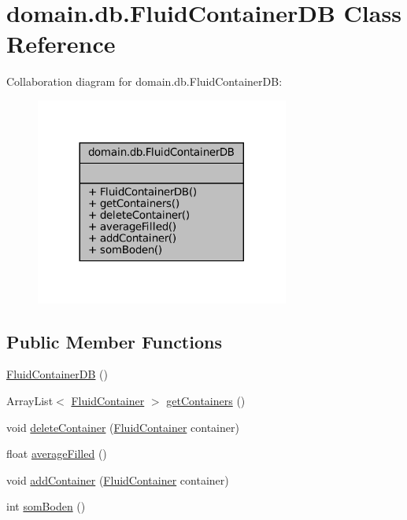 \hypertarget{classdomain_1_1db_1_1FluidContainerDB}{}\section{domain.\+db.\+Fluid\+Container\+DB Class Reference}
\label{classdomain_1_1db_1_1FluidContainerDB}


Collaboration diagram for domain.\+db.\+Fluid\+Container\+DB\+:
\nopagebreak
\begin{figure}[H]
\begin{center}
\leavevmode
\includegraphics[width=236pt]{classdomain_1_1db_1_1FluidContainerDB__coll__graph}
\end{center}
\end{figure}
\subsection*{Public Member Functions}
\begin{DoxyCompactItemize}
\item 
\mbox{\hyperlink{classdomain_1_1db_1_1FluidContainerDB_a4be019ea28e380e237c9e6a644a882b0}{Fluid\+Container\+DB}} ()
\item 
Array\+List$<$ \mbox{\hyperlink{classdomain_1_1model_1_1FluidContainer}{Fluid\+Container}} $>$ \mbox{\hyperlink{classdomain_1_1db_1_1FluidContainerDB_a8f01e75570ae3a6dca1d7850252f55b6}{get\+Containers}} ()
\item 
void \mbox{\hyperlink{classdomain_1_1db_1_1FluidContainerDB_a1b59e18960bac601c221cedee46a5e41}{delete\+Container}} (\mbox{\hyperlink{classdomain_1_1model_1_1FluidContainer}{Fluid\+Container}} container)
\item 
float \mbox{\hyperlink{classdomain_1_1db_1_1FluidContainerDB_a64b6a635b6ff258e70986be8b3a75174}{average\+Filled}} ()
\item 
void \mbox{\hyperlink{classdomain_1_1db_1_1FluidContainerDB_a0363859bbbc37d8206fb27105714417f}{add\+Container}} (\mbox{\hyperlink{classdomain_1_1model_1_1FluidContainer}{Fluid\+Container}} container)
\item 
int \mbox{\hyperlink{classdomain_1_1db_1_1FluidContainerDB_a624c6278044ff6f8019b5ab088403499}{som\+Boden}} ()
\end{DoxyCompactItemize}


